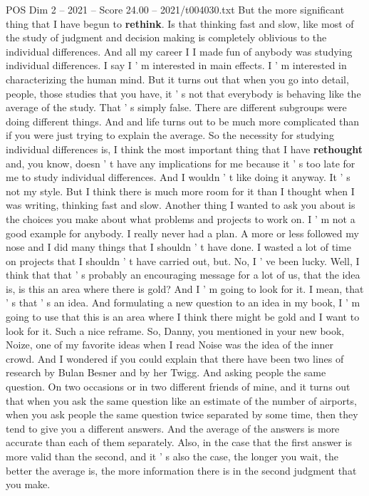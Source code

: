 \begin{textsample}{POS Dim 2 – 2021 – Score 24.00 – 2021/t004030.txt}
But the more significant thing that I have begun to \textbf{rethink}.
Is that thinking fast and slow, like most of the study of judgment and decision making is completely oblivious to the individual differences.
And all my career I I made fun of anybody was studying individual differences.
I say I ' m interested in main effects.
I ' m interested in characterizing the human mind.
But it turns out that when you go into detail, people, those studies that you have, it ' s not that everybody is behaving like the average of the study.
That ' s simply false.
There are different subgroups were doing different things.
And and life turns out to be much more complicated than if you were just trying to explain the average.
So the necessity for studying individual differences is, I think the most important thing that I have \textbf{rethought} and, you know, doesn ' t have any implications for me because it ' s too late for me to study individual differences.
And I wouldn ' t like doing it anyway.
It ' s not my style.
But I think there is much more room for it than I thought when I was writing, thinking fast and slow.
Another thing I wanted to ask you about is the choices you make about what problems and projects to work on.
I ' m not a good example for anybody.
I really never had a plan.
A more or less followed my nose and I did many things that I shouldn ' t have done.
I wasted a lot of time on projects that I shouldn ' t have carried out, but.
No, I ' ve been lucky.
Well, I think that that ' s probably an encouraging message for a lot of us, that the idea is, is this an area where there is gold?
And I ' m going to look for it.
I mean, that ' s that ' s an idea.
And formulating a new question to an idea in my book, I ' m going to use that this is an area where I think there might be gold and I want to look for it.
Such a nice reframe.
So, Danny, you mentioned in your new book, Noize, one of my favorite ideas when I read Noise was the idea of the inner crowd.
And I wondered if you could explain that there have been two lines of research by Bulan Besner and by her Twigg.
And asking people the same question.
On two occasions or in two different friends of mine, and it turns out that when you ask the same question like an estimate of the number of airports, when you ask people the same question twice separated by some time, then they tend to give you a different answers.
And the average of the answers is more accurate than each of them separately.
Also, in the case that the first answer is more valid than the second, and it ' s also the case, the longer you wait, the better the average is, the more information there is in the second judgment that you make.

\end{textsample}
